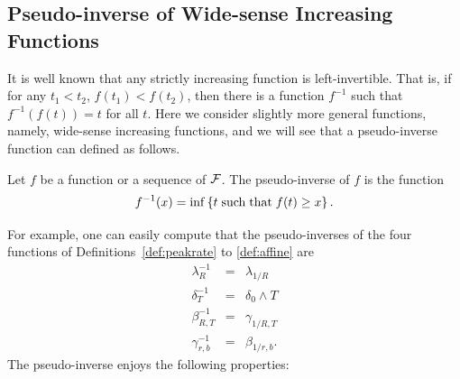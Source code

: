\subsection{Pseudo-inverse of Wide-sense Increasing Functions}
It is well known that any strictly increasing function is
left-invertible. That is, if for any $t_1 < t_2$, $f(t_1) <
f(t_2)$, then there is a function $f^{-1}$ such that $f^{-1}(f(t))
= t$ for all $t$. Here we consider slightly more general
functions, namely, wide-sense increasing functions, and we will
see that a pseudo-inverse function can defined as follows.
\begin{definition}
Let $f$ be a function or a sequence of $\mathcal F$. The pseudo-inverse of $f$ is the function
\begin{equation}
\mylabel{eq:pseudo-inverse}
f^{-1}(x) = \inf \left\{ t  \mst f(t) \geq x \right\}.
\end{equation}
\end{definition}
For example, one can easily compute that the pseudo-inverses of the four functions of Definitions~\ref{def:peakrate} to
\ref{def:affine} are
\begin{eqnarray*}
\lambda_R^{-1} & = & \lambda_{1/R} \\
\delta_{T}^{-1} & = & \delta_0 \wedge T \\
\beta_{R,T}^{-1} & = & \gamma_{1/R,T}\\
\gamma_{r,b}^{-1} & = & \beta_{1/r,b}.
\end{eqnarray*}
The pseudo-inverse enjoys the following properties:
